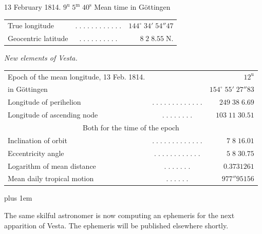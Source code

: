 \begin{center}13 February 1814. $9^{\mathrm u}\;5^{\mathrm m}\;40^{\mathrm s}$ Mean time in Göttingen\end{center}
\begin{center}\fontsize{10}{12}\selectfont\setlength{\tabcolsep}{2pt}\renewcommand{\arraystretch}{1.15}\begin{tabular}{lcr}
True longitude & $.\;.\;.\;.\;.\;.\;.\;.\;.\;.\;.\;.$ & $144^\circ\;34'\;54''47$\\
Geocentric latitude & $.\;.\;.\;.\;.\;.\;.\;.\;.\;.$ & $8\;2\;8.55\;\mathrm{N.}$\\
\end{tabular}\end{center}

\emph{New elements of Vesta.}

\begin{center}\fontsize{9}{11}\selectfont\setlength{\tabcolsep}{2pt}\renewcommand{\arraystretch}{1.15}\begin{tabular}{lcr}
Epoch of the mean longitude, 13 Feb. 1814. & & $12^{\mathrm u}$\\
in Göttingen & & $154^\circ\;55'\;27''83$\\
Longitude of perihelion & $.\;.\;.\;.\;.\;.\;.\;.\;.\;.\;.\;.\;.$ & $249\;38\;6.69$\\
Longitude of ascending node & $.\;.\;.\;.\;.\;.\;.\;.$ & $103\;11\;30.51$\\
\multicolumn{3}{c}{Both for the time of the epoch}\\
Inclination of orbit & $.\;.\;.\;.\;.\;.\;.\;.\;.\;.\;.\;.\;.$ & $7\;8\;16.01$\\
Eccentricity angle & $.\;.\;.\;.\;.\;.\;.\;.\;.\;.\;.\;.$ & $5\;8\;30.75$\\
Logarithm of mean distance & $.\;.\;.\;.\;.\;.\;.$ & $0.3731261$\\
Mean daily tropical motion & $.\;.\;.\;.\;.\;.$ & $977''95156$\\
\end{tabular}\end{center}

{\rightskip=0pt plus 1em \par\indent The same skilful astronomer is now computing an ephemeris for the next apparition of Vesta. The ephemeris will be published elsewhere shortly.\par}
